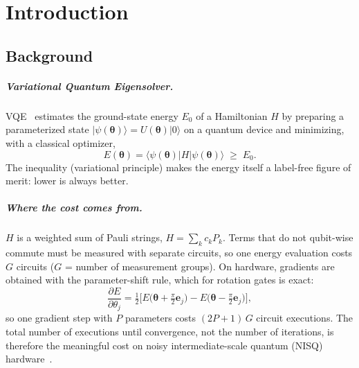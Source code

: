 \documentclass{ssnreview}
\begin{document}
\chapter{Introduction}

\section{Background}

\paragraph{Variational Quantum Eigensolver.} VQE~\cite{peruzzo2014,tilly2022} estimates the
ground-state energy $E_0$ of a Hamiltonian $H$ by preparing a parameterized state
$|\psi(\boldsymbol\theta)\rangle = U(\boldsymbol\theta)|0\rangle$ on a quantum device and
minimizing, with a classical optimizer,
\begin{equation}
  E(\boldsymbol\theta) = \langle\psi(\boldsymbol\theta)|H|\psi(\boldsymbol\theta)\rangle \;\ge\; E_0 .
  \label{eq:vqe}
\end{equation}
The inequality (variational principle) makes the energy itself a label-free figure of merit:
lower is always better.

\paragraph{Where the cost comes from.} $H$ is a weighted sum of Pauli strings,
$H=\sum_k c_k P_k$. Terms that do not qubit-wise commute must be measured with separate circuits,
so one energy evaluation costs $G$ circuits ($G$ = number of measurement groups). On hardware,
gradients are obtained with the parameter-shift rule, which for rotation gates is exact:
\begin{equation}
  \frac{\partial E}{\partial\theta_j} = \tfrac12\Big[E\big(\boldsymbol\theta+\tfrac{\pi}{2}\mathbf e_j\big)
  - E\big(\boldsymbol\theta-\tfrac{\pi}{2}\mathbf e_j\big)\Big],
  \label{eq:pshift}
\end{equation}
so one gradient step with $P$ parameters costs $(2P+1)\,G$ circuit executions. The total number
of executions until convergence, not the number of iterations, is therefore the meaningful cost
on noisy intermediate-scale quantum (NISQ) hardware~\cite{preskill2018}.
\end{document}
